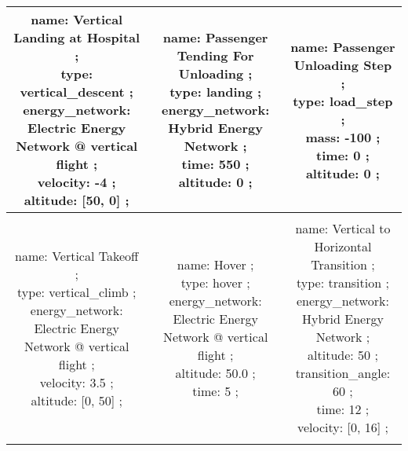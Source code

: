 \begin{table}[h]
\begin{adjustbox}{width=1\textwidth}
\begin{tabular}{|c|c|c|}
\makecell{name: Vertical Landing at Hospital ; \\ type: vertical\_descent ; \\ energy\_network: Electric Energy Network @ vertical flight ; \\ velocity: -4 ; \\ altitude: [50, 0] ; \\ } & \makecell{name: Passenger Tending For Unloading ; \\ type: landing ; \\ energy\_network: Hybrid Energy Network ; \\ time: 550 ; \\ altitude: 0 ; \\ } & \makecell{name: Passenger Unloading Step ; \\ type: load\_step ; \\ mass: -100 ; \\ time: 0 ; \\ altitude: 0 ; \\ }\\ \hline \\ 
\makecell{name: Vertical Takeoff ; \\ type: vertical\_climb ; \\ energy\_network: Electric Energy Network @ vertical flight ; \\ velocity: 3.5 ; \\ altitude: [0, 50] ; \\ } & \makecell{name: Hover ; \\ type: hover ; \\ energy\_network: Electric Energy Network @ vertical flight ; \\ altitude: 50.0 ; \\ time: 5 ; \\ } & \makecell{name: Vertical to Horizontal Transition ; \\ type: transition ; \\ energy\_network: Hybrid Energy Network ; \\ altitude: 50 ; \\ transition\_angle: 60 ; \\ time: 12 ; \\ velocity: [0, 16] ; \\ }\\ \hline \\ 

\end{tabular}
\end{adjustbox}
\end{table}
